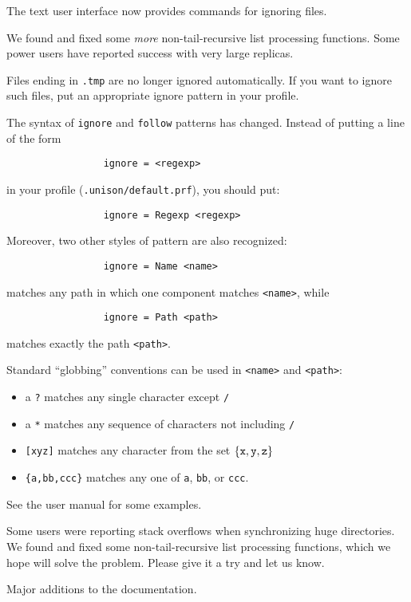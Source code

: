 \begin{changesfromversion}{1.169}
\item The text user interface now provides commands for ignoring
  files. 
\item We found and fixed some {\em more} non-tail-recursive list
  processing functions.  Some power users have reported success with
  very large replicas.
\item \incompatible 
Files ending in \verb|.tmp| are no longer ignored automatically.  If you want
to ignore such files, put an appropriate ignore pattern in your profile.

\item \incompatible{} The syntax of {\tt ignore} and {\tt follow}
patterns has changed. Instead of putting a line of the form
\begin{verbatim}
                 ignore = <regexp>
\end{verbatim}
  in your profile ({\tt .unison/default.prf}), you should put:
\begin{verbatim}
                 ignore = Regexp <regexp>
\end{verbatim}
Moreover, two other styles of pattern are also recognized:
\begin{verbatim}
                 ignore = Name <name>
\end{verbatim}
matches any path in which one component matches \verb|<name>|, while
\begin{verbatim}
                 ignore = Path <path>
\end{verbatim}
matches exactly the path \verb|<path>|.

Standard ``globbing'' conventions can be used in \verb|<name>| and
\verb|<path>|:  
\begin{itemize}
\item a \verb|?| matches any single character except \verb|/|
\item a \verb|*| matches any sequence of characters not including \verb|/|
\item \verb|[xyz]| matches any character from the set $\{{\tt x},
  {\tt y}, {\tt z} \}$
\item \verb|{a,bb,ccc}| matches any one of \verb|a|, \verb|bb|, or
  \verb|ccc|. 
\end{itemize}

See the user manual for some examples.
\end{changesfromversion}

\begin{changesfromversion}{1.146}
\item Some users were reporting stack overflows when synchronizing
  huge directories.  We found and fixed some non-tail-recursive list
  processing functions, which we hope will solve the problem.  Please 
  give it a try and let us know.
\item Major additions to the documentation.  
\end{changesfromversion}

